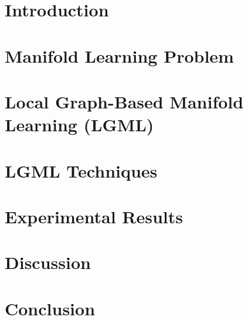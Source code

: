 \documentclass[12pt, t]{article}
\begin{document}
\section{Introduction}
\label{intro}


\section{Manifold Learning Problem}
\label{math}


\section{Local Graph-Based Manifold Learning (LGML)}
\label{lgml}


\section{LGML Techniques}
\label{techniques}


% 

\section{Experimental Results}
\label{experiment}


\section{Discussion}
\label{discussion}


\section{Conclusion}
\label{concl}


\newpage

    
\end{document}
